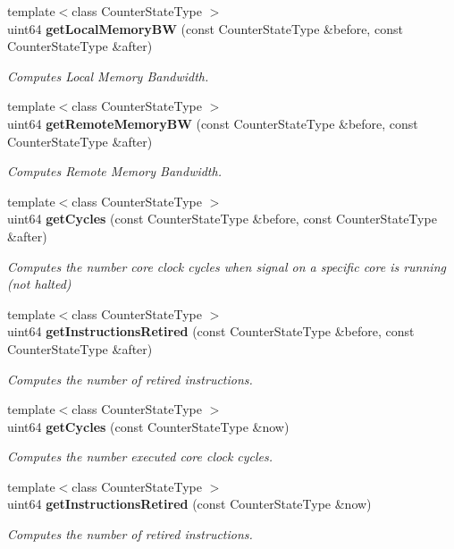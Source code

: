 \begin{DoxyCompactItemize}
{\footnotesize template$<$class Counter\+State\+Type $>$ }\\uint64 \textbf{ get\+Local\+Memory\+BW} (const Counter\+State\+Type \&before, const Counter\+State\+Type \&after)
\begin{DoxyCompactList}\small\item\em Computes Local Memory Bandwidth. \end{DoxyCompactList}\item 
{\footnotesize template$<$class Counter\+State\+Type $>$ }\\uint64 \textbf{ get\+Remote\+Memory\+BW} (const Counter\+State\+Type \&before, const Counter\+State\+Type \&after)
\begin{DoxyCompactList}\small\item\em Computes Remote Memory Bandwidth. \end{DoxyCompactList}\item 
{\footnotesize template$<$class Counter\+State\+Type $>$ }\\uint64 \textbf{ get\+Cycles} (const Counter\+State\+Type \&before, const Counter\+State\+Type \&after)
\begin{DoxyCompactList}\small\item\em Computes the number core clock cycles when signal on a specific core is running (not halted) \end{DoxyCompactList}\item 
{\footnotesize template$<$class Counter\+State\+Type $>$ }\\uint64 \textbf{ get\+Instructions\+Retired} (const Counter\+State\+Type \&before, const Counter\+State\+Type \&after)
\begin{DoxyCompactList}\small\item\em Computes the number of retired instructions. \end{DoxyCompactList}\item 
{\footnotesize template$<$class Counter\+State\+Type $>$ }\\uint64 \textbf{ get\+Cycles} (const Counter\+State\+Type \&now)
\begin{DoxyCompactList}\small\item\em Computes the number executed core clock cycles. \end{DoxyCompactList}\item 
{\footnotesize template$<$class Counter\+State\+Type $>$ }\\uint64 \textbf{ get\+Instructions\+Retired} (const Counter\+State\+Type \&now)
\begin{DoxyCompactList}\small\item\em Computes the number of retired instructions. \end{DoxyCompactList}\item 

\end{DoxyCompactItemize}
